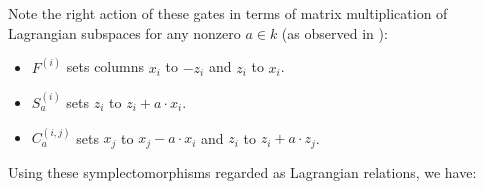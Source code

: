 Note the right action of these gates in terms of matrix multiplication of Lagrangian subspaces for any nonzero $a \in k$ (as observed in \cite[page 4]{aaronson}):

\begin{itemize}
\item
$F^{(i)}$ sets columns $x_i$ to $-z_i$ and $z_i$ to $x_i$.

\item
$S_a^{(i)}$ sets $z_i$ to $z_i+a\cdot x_i$.


\item
$C_a^{(i,j)}$ sets $x_j$ to $x_j- a \cdot x_i$ and $z_i$ to $z_i+a\cdot z_j$.

\end{itemize}

Using these symplectomorphisms regarded as Lagrangian relations, we have:


